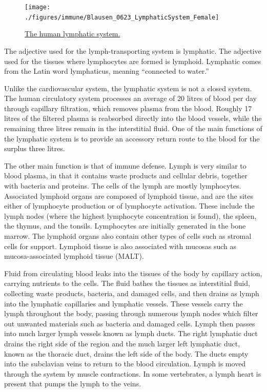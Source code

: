 \begin{figure}

{\centering \texttt{[image: ./figures/immune/Blausen\_0623\_LymphaticSystem\_Female]} 

}

\caption{\href{https://commons.wikimedia.org/wiki/File:Blausen_0623_LymphaticSystem_Female.png}{The human lymphatic system.}}\label{fig:lymphaticsystem}
\end{figure}

The adjective used for the lymph-transporting system is lymphatic. The adjective used for the tissues where lymphocytes are formed is lymphoid. Lymphatic comes from the Latin word lymphaticus, meaning ``connected to water.''

Unlike the cardiovascular system, the lymphatic system is not a closed system. The human circulatory system processes an average of 20 litres of blood per day through capillary filtration, which removes plasma from the blood. Roughly 17 litres of the filtered plasma is reabsorbed directly into the blood vessels, while the remaining three litres remain in the interstitial fluid. One of the main functions of the lymphatic system is to provide an accessory return route to the blood for the surplus three litres.

The other main function is that of immune defense. Lymph is very similar to blood plasma, in that it contains waste products and cellular debris, together with bacteria and proteins. The cells of the lymph are mostly lymphocytes. Associated lymphoid organs are composed of lymphoid tissue, and are the sites either of lymphocyte production or of lymphocyte activation. These include the lymph nodes (where the highest lymphocyte concentration is found), the spleen, the thymus, and the tonsils. Lymphocytes are initially generated in the bone marrow. The lymphoid organs also contain other types of cells such as stromal cells for support. Lymphoid tissue is also associated with mucosas such as mucosa-associated lymphoid tissue (MALT).

Fluid from circulating blood leaks into the tissues of the body by capillary action, carrying nutrients to the cells. The fluid bathes the tissues as interstitial fluid, collecting waste products, bacteria, and damaged cells, and then drains as lymph into the lymphatic capillaries and lymphatic vessels. These vessels carry the lymph throughout the body, passing through numerous lymph nodes which filter out unwanted materials such as bacteria and damaged cells. Lymph then passes into much larger lymph vessels known as lymph ducts. The right lymphatic duct drains the right side of the region and the much larger left lymphatic duct, known as the thoracic duct, drains the left side of the body. The ducts empty into the subclavian veins to return to the blood circulation. Lymph is moved through the system by muscle contractions. In some vertebrates, a lymph heart is present that pumps the lymph to the veins.

